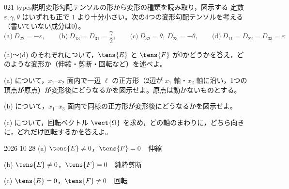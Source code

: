 \documentclass[uplatex,dvipdfmx,a4paper,11pt]{jsarticle}
\begin{document}
\begin{mondai}{021-types}{説明}{変形勾配テンソルの形から変形の種類を読み取り，図示する}
定数 $\varepsilon,\gamma,\theta$ はいずれも正で $1$ より十分小さい。次の4つの変形勾配テンソルを考える（書いていない成分は0）。
  \[ \text{(a)}\ D_{22}=-\varepsilon,\qquad \text{(b)}\ D_{13}=D_{31}=\frac{\gamma}{2},\qquad \text{(c)}\ D_{32}=\theta,\ D_{23}=-\theta,\qquad \text{(d)}\ D_{11}=D_{22}=D_{33}=\varepsilon \]
  \begin{shoumon}
    \item (a)〜(d) のそれぞれについて，$\tens{E}$ と $\tens{F}$ が0かどうかを答え，どのような変形か（伸縮・剪断・回転など）を述べよ。
    \item (a) について，$x_1$--$x_2$ 面内で一辺 $\ell$ の正方形（2辺が $x_1$ 軸・$x_2$ 軸に沿い，1つの頂点が原点）が変形後にどうなるかを図示せよ。原点は動かないものとする。
    \item (b) について，$x_1$--$x_3$ 面内で同様の正方形が変形後にどうなるかを図示せよ。
    \item (c) について，回転ベクトル $\vect{\Omega}$ を求め，どの軸のまわりに，どちら向きに，どれだけ回転するかを答えよ。
  \end{shoumon}
\begin{kotaeutsushi}{2026-10-28}
(a) $\tens{E}\neq0$，$\tens{F}=0$　伸縮

(b) $\tens{E}\neq0$，$\tens{F}=0$　純粋剪断

(c) $\tens{E}=0$，$\tens{F}\neq0$　回転


\end{kotaeutsushi}
\end{mondai}
\end{document}
